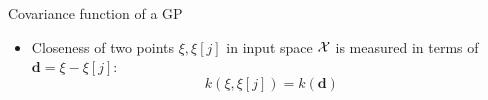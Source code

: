 \begin{vbframe}{Covariance function of a GP}
\begin{itemize}
  \item Closeness of two points $\xi, \xi[j]$ in input space $\mathcal{X}$ is measured in terms of $\bm{d} = \xi - \xi[j]$: 
  $$
    k(\xi, \xi[j]) = k(\bm{d})
  $$ 
\end{itemize}









\end{vbframe}

